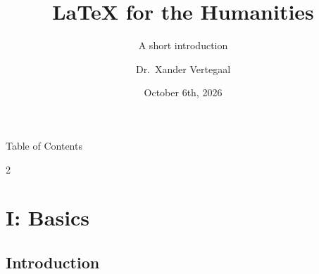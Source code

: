 \documentclass{beamer}
\title{\LaTeX{} for the Humanities}
\subtitle{A short introduction}
\author{Dr.\ Xander Vertegaal}
\institute{Utrecht University Centre for Digital Humanities}
\date{October 6th, 2026}
\begin{document}
\begin{frame}
    \titlepage%
\end{frame}

\begin{frame}{Table of Contents}
    \begin{multicols}{2}
        \tableofcontents
    \end{multicols}
\end{frame}

\section{I: Basics}

\subsection{Introduction}
\end{document}
